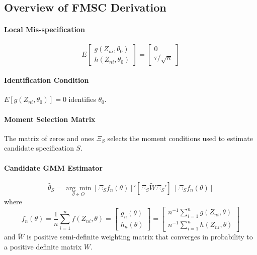 \subsection{Overview of FMSC Derivation}

\paragraph{Local Mis-specification}
	$$E\left[\begin{array}
		{c}
		g(Z_{ni},\theta_0)\\
		h(Z_{ni}, \theta_0)
	\end{array} \right] = \left[ \begin{array}
		{c} 0 \\ \tau/\sqrt{n}
	\end{array}\right]$$

\paragraph{Identification Condition} $E[g(Z_{ni},\theta_0)]=0$ identifies $\theta_0$.

\paragraph{Moment Selection Matrix} The matrix of zeros and ones $\Xi_S$ selects the moment conditions used to estimate candidate specification $S$.

\paragraph{Candidate GMM Estimator}
	$$\widehat{\theta}_S = \underset{\theta \in \Theta}{\arg \min} \left[\Xi_S f_n(\theta)\right]' \left[ \Xi_S \widetilde{W} \Xi_S'\right] \; \left[ \Xi_S f_n(\theta)\right]$$
where
$$f_n(\theta) = \frac{1}{n}\sum_{i=1}^n f(Z_{ni},\theta) = \left[\begin{array}{c} g_n(\theta)\\ h_n(\theta) \end{array} \right]=\left[\begin{array}{c}n^{-1}\sum_{i=1}^n g(Z_{ni},\theta) \\ n^{-1}\sum_{i=1}^n h(Z_{ni},\theta) \end{array}\right]$$
and $\widetilde{W}$ is positive semi-definite weighting matrix that converges in probability to a positive definite matrix $W$.

